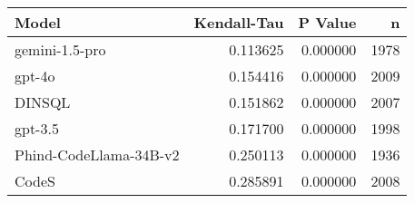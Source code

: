 \begin{tabular}{lrrr}
\toprule
Model & Kendall-Tau & P Value & n \\
\midrule
gemini-1.5-pro & 0.113625 & 0.000000 & 1978 \\
gpt-4o & 0.154416 & 0.000000 & 2009 \\
DINSQL & 0.151862 & 0.000000 & 2007 \\
gpt-3.5 & 0.171700 & 0.000000 & 1998 \\
Phind-CodeLlama-34B-v2 & 0.250113 & 0.000000 & 1936 \\
CodeS & 0.285891 & 0.000000 & 2008 \\
\bottomrule
\end{tabular}
